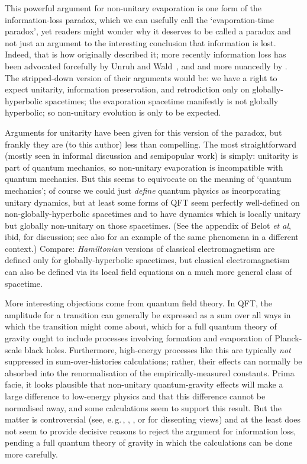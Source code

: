 \documentclass{article}
\newcommand{\egc}{\mbox{e.\,g.\,}}
\begin{document}
This powerful argument for non-unitary evaporation is one form of the information-loss paradox, which we can usefully call the `evaporation-time paradox', yet readers might wonder why it deserves to be called a paradox and not just an argument to the interesting conclusion that information is lost. Indeed, that is how  originally described it; more recently information loss has been advocated forcefully by Unruh and Wald~\citeyear{unruhwaldpuremixed,unruhwaldinformation},  and  and more nuancedly by . The stripped-down version of their arguments would be: we have a right to expect unitarity, information preservation, and retrodiction only on globally-hyperbolic spacetimes; the evaporation spacetime manifestly is not globally hyperbolic; so non-unitary evolution is only to be expected.

Arguments for unitarity have been given for this version of the paradox, but frankly they are (to this author) less than compelling. The most straightforward (mostly seen in informal discussion and semipopular work) is simply: unitarity is part of quantum mechanics, so non-unitary evaporation is incompatible with quantum mechanics. But this seems to equivocate on the meaning of `quantum mechanics'; of course we could just \emph{define} quantum physics as incorporating unitary dynamics, but at least some forms of QFT seem perfectly well-defined on non-globally-hyperbolic spacetimes and to have dynamics which is locally unitary but globally non-unitary on those spacetimes. (See the appendix of Belot \emph{et al}, ibid, for discussion; see also  for an example of the same phenomena in a different context.) Compare: \emph{Hamiltonian} versions of classical electromagnetism are defined only for globally-hyperbolic spacetimes, but classical electromagnetism can also be defined via its local field equations on a much more general class of spacetime. 

More interesting objections come from quantum field theory. In QFT, the amplitude for a transition can generally be expressed as  a sum over all ways in which the transition might come about, which for a full quantum theory of gravity ought to include processes involving formation and evaporation of Planck-scale black holes. Furthermore, high-energy processes like this are typically \emph{not} suppressed in sum-over-histories calculations; rather, their effects can normally be absorbed into the renormalisation of the empirically-measured constants. Prima facie, it looks plausible that non-unitary quantum-gravity effects will make a large difference to low-energy physics and that this difference cannot be normalised away, and some calculations \cite{bankspeskinsusskind,srednickipurity} seem to support this result. But the matter is controversial (see, \egc, , , or  for dissenting views) and at the least does not seem to provide decisive reasons to reject the argument for information loss, pending a full quantum theory of gravity in which the calculations can be done more carefully.
\end{document}
